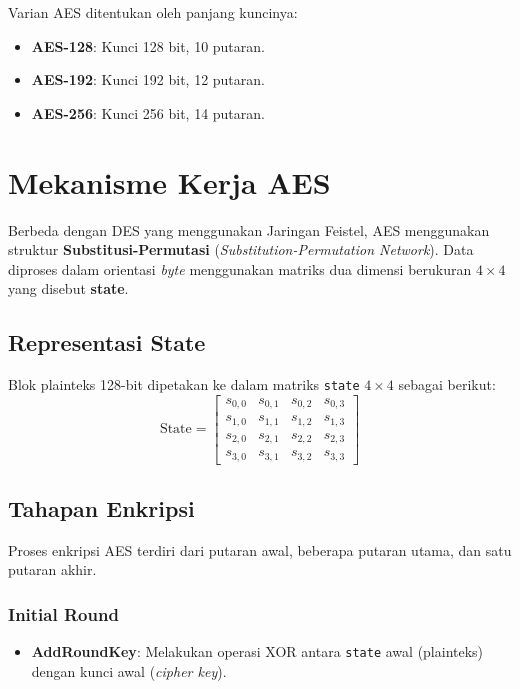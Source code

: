 \documentclass[../main.tex]{subfiles}
\begin{document}
Varian AES ditentukan oleh panjang kuncinya:
\begin{itemize}
    \item \textbf{AES-128}: Kunci 128 bit, 10 putaran.
    \item \textbf{AES-192}: Kunci 192 bit, 12 putaran.
    \item \textbf{AES-256}: Kunci 256 bit, 14 putaran.
\end{itemize}

\section{Mekanisme Kerja AES}
Berbeda dengan DES yang menggunakan Jaringan Feistel, AES menggunakan struktur \textbf{Substitusi-Permutasi} (\textit{Substitution-Permutation Network}). Data diproses dalam orientasi \textit{byte} menggunakan matriks dua dimensi berukuran $4 \times 4$ yang disebut \textbf{state}.

\subsection{Representasi State}
Blok plainteks 128-bit dipetakan ke dalam matriks \texttt{state} $4 \times 4$ sebagai berikut:
\[
\text{State} = \begin{bmatrix}
s_{0,0} & s_{0,1} & s_{0,2} & s_{0,3} \\
s_{1,0} & s_{1,1} & s_{1,2} & s_{1,3} \\
s_{2,0} & s_{2,1} & s_{2,2} & s_{2,3} \\
s_{3,0} & s_{3,1} & s_{3,2} & s_{3,3}
\end{bmatrix}
\]

\subsection{Tahapan Enkripsi}
Proses enkripsi AES terdiri dari putaran awal, beberapa putaran utama, dan satu putaran akhir.

\subsubsection{Initial Round}
\begin{itemize}
    \item \textbf{AddRoundKey}: Melakukan operasi XOR antara \texttt{state} awal (plainteks) dengan kunci awal (\textit{cipher key}).
\end{itemize}
\end{document}
